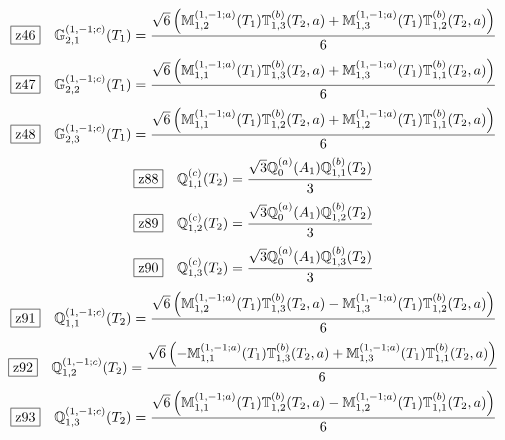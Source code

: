 \documentclass[fleqn,10pt,landscape]{jsarticle}
\begin{document}
\begin{dmath*}
\hspace*{3mm}\fbox{z46}\quad \mathbb{G}_{2,1}^{(1,-1;c)}(T_{1})=\frac{\sqrt{6} \left(\mathbb{M}_{1,2}^{(1,-1;a)}(T_{1}) \mathbb{T}_{1,3}^{(b)}(T_{2},a) + \mathbb{M}_{1,3}^{(1,-1;a)}(T_{1}) \mathbb{T}_{1,2}^{(b)}(T_{2},a)\right)}{6}
\end{dmath*}
\begin{dmath*}
\hspace*{3mm}\fbox{z47}\quad \mathbb{G}_{2,2}^{(1,-1;c)}(T_{1})=\frac{\sqrt{6} \left(\mathbb{M}_{1,1}^{(1,-1;a)}(T_{1}) \mathbb{T}_{1,3}^{(b)}(T_{2},a) + \mathbb{M}_{1,3}^{(1,-1;a)}(T_{1}) \mathbb{T}_{1,1}^{(b)}(T_{2},a)\right)}{6}
\end{dmath*}
\begin{dmath*}
\hspace*{3mm}\fbox{z48}\quad \mathbb{G}_{2,3}^{(1,-1;c)}(T_{1})=\frac{\sqrt{6} \left(\mathbb{M}_{1,1}^{(1,-1;a)}(T_{1}) \mathbb{T}_{1,2}^{(b)}(T_{2},a) + \mathbb{M}_{1,2}^{(1,-1;a)}(T_{1}) \mathbb{T}_{1,1}^{(b)}(T_{2},a)\right)}{6}
\end{dmath*}
\begin{dmath*}
\hspace*{3mm}\fbox{z88}\quad \mathbb{Q}_{1,1}^{(c)}(T_{2})=\frac{\sqrt{3} \mathbb{Q}_{0}^{(a)}(A_{1}) \mathbb{Q}_{1,1}^{(b)}(T_{2})}{3}
\end{dmath*}
\begin{dmath*}
\hspace*{3mm}\fbox{z89}\quad \mathbb{Q}_{1,2}^{(c)}(T_{2})=\frac{\sqrt{3} \mathbb{Q}_{0}^{(a)}(A_{1}) \mathbb{Q}_{1,2}^{(b)}(T_{2})}{3}
\end{dmath*}
\begin{dmath*}
\hspace*{3mm}\fbox{z90}\quad \mathbb{Q}_{1,3}^{(c)}(T_{2})=\frac{\sqrt{3} \mathbb{Q}_{0}^{(a)}(A_{1}) \mathbb{Q}_{1,3}^{(b)}(T_{2})}{3}
\end{dmath*}
\begin{dmath*}
\hspace*{3mm}\fbox{z91}\quad \mathbb{Q}_{1,1}^{(1,-1;c)}(T_{2})=\frac{\sqrt{6} \left(\mathbb{M}_{1,2}^{(1,-1;a)}(T_{1}) \mathbb{T}_{1,3}^{(b)}(T_{2},a) - \mathbb{M}_{1,3}^{(1,-1;a)}(T_{1}) \mathbb{T}_{1,2}^{(b)}(T_{2},a)\right)}{6}
\end{dmath*}
\begin{dmath*}
\hspace*{3mm}\fbox{z92}\quad \mathbb{Q}_{1,2}^{(1,-1;c)}(T_{2})=\frac{\sqrt{6} \left(- \mathbb{M}_{1,1}^{(1,-1;a)}(T_{1}) \mathbb{T}_{1,3}^{(b)}(T_{2},a) + \mathbb{M}_{1,3}^{(1,-1;a)}(T_{1}) \mathbb{T}_{1,1}^{(b)}(T_{2},a)\right)}{6}
\end{dmath*}
\begin{dmath*}
\hspace*{3mm}\fbox{z93}\quad \mathbb{Q}_{1,3}^{(1,-1;c)}(T_{2})=\frac{\sqrt{6} \left(\mathbb{M}_{1,1}^{(1,-1;a)}(T_{1}) \mathbb{T}_{1,2}^{(b)}(T_{2},a) - \mathbb{M}_{1,2}^{(1,-1;a)}(T_{1}) \mathbb{T}_{1,1}^{(b)}(T_{2},a)\right)}{6}
\end{dmath*}
\vspace{5mm}
\end{document}

